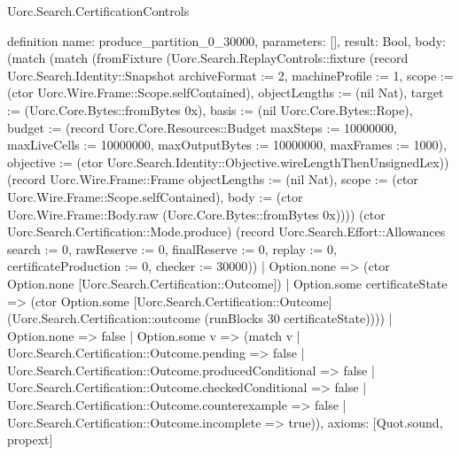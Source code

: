 \begin{lexlean}{Uorc.Search.CertificationControls}
\begin{semanticmodule}
definition{
  name: produce_partition_0_30000,
  parameters: [],
  result: Bool,
  body: (match (match (fromFixture (Uorc.Search.ReplayControls::fixture (record Uorc.Search.Identity::Snapshot {archiveFormat := 2, machineProfile := 1, scope := (ctor Uorc.Wire.Frame::Scope.selfContained), objectLengths := (nil Nat), target := (Uorc.Core.Bytes::fromBytes 0x), basis := (nil Uorc.Core.Bytes::Rope), budget := (record Uorc.Core.Resources::Budget {maxSteps := 10000000, maxLiveCells := 10000000, maxOutputBytes := 10000000, maxFrames := 1000}), objective := (ctor Uorc.Search.Identity::Objective.wireLengthThenUnsignedLex)}) (record Uorc.Wire.Frame::Frame {objectLengths := (nil Nat), scope := (ctor Uorc.Wire.Frame::Scope.selfContained), body := (ctor Uorc.Wire.Frame::Body.raw (Uorc.Core.Bytes::fromBytes 0x))})) (ctor Uorc.Search.Certification::Mode.produce) (record Uorc.Search.Effort::Allowances {search := 0, rawReserve := 0, finalReserve := 0, replay := 0, certificateProduction := 0, checker := 30000}))
      | Option.none => (ctor Option.none [Uorc.Search.Certification::Outcome])
      | Option.some certificateState => (ctor Option.some [Uorc.Search.Certification::Outcome] (Uorc.Search.Certification::outcome (runBlocks 30 certificateState))))
    | Option.none => false
    | Option.some v => (match v
      | Uorc.Search.Certification::Outcome.pending => false
      | Uorc.Search.Certification::Outcome.producedConditional => false
      | Uorc.Search.Certification::Outcome.checkedConditional => false
      | Uorc.Search.Certification::Outcome.counterexample => false
      | Uorc.Search.Certification::Outcome.incomplete => true)),
  axioms: [Quot.sound, propext]
}


\end{semanticmodule}
\end{lexlean}
